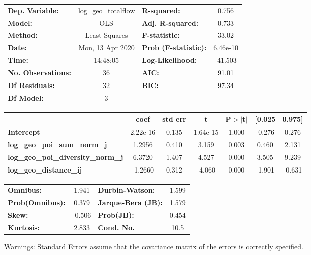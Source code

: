 \begin{center}
\begin{tabular}{lclc}
\toprule
\textbf{Dep. Variable:}                    & log\_geo\_totalflow & \textbf{  R-squared:         } &     0.756   \\
\textbf{Model:}                            &         OLS         & \textbf{  Adj. R-squared:    } &     0.733   \\
\textbf{Method:}                           &    Least Squares    & \textbf{  F-statistic:       } &     33.02   \\
\textbf{Date:}                             &   Mon, 13 Apr 2020  & \textbf{  Prob (F-statistic):} &  6.46e-10   \\
\textbf{Time:}                             &       14:48:05      & \textbf{  Log-Likelihood:    } &   -41.503   \\
\textbf{No. Observations:}                 &            36       & \textbf{  AIC:               } &     91.01   \\
\textbf{Df Residuals:}                     &            32       & \textbf{  BIC:               } &     97.34   \\
\textbf{Df Model:}                         &             3       & \textbf{                     } &             \\
\bottomrule
\end{tabular}
\begin{tabular}{lcccccc}
                                           & \textbf{coef} & \textbf{std err} & \textbf{t} & \textbf{P$> |$t$|$} & \textbf{[0.025} & \textbf{0.975]}  \\
\midrule
\textbf{Intercept}                         &     2.22e-16  &        0.135     &  1.64e-15  &         1.000        &       -0.276    &        0.276     \\
\textbf{log\_geo\_poi\_sum\_norm\_j}       &       1.2956  &        0.410     &     3.159  &         0.003        &        0.460    &        2.131     \\
\textbf{log\_geo\_poi\_diversity\_norm\_j} &       6.3720  &        1.407     &     4.527  &         0.000        &        3.505    &        9.239     \\
\textbf{log\_geo\_distance\_ij}            &      -1.2660  &        0.312     &    -4.060  &         0.000        &       -1.901    &       -0.631     \\
\bottomrule
\end{tabular}
\begin{tabular}{lclc}
\textbf{Omnibus:}       &  1.941 & \textbf{  Durbin-Watson:     } &    1.599  \\
\textbf{Prob(Omnibus):} &  0.379 & \textbf{  Jarque-Bera (JB):  } &    1.579  \\
\textbf{Skew:}          & -0.506 & \textbf{  Prob(JB):          } &    0.454  \\
\textbf{Kurtosis:}      &  2.833 & \textbf{  Cond. No.          } &     10.5  \\
\bottomrule
\end{tabular}
\end{center}

Warnings: \newline
 [1] Standard Errors assume that the covariance matrix of the errors is correctly specified.